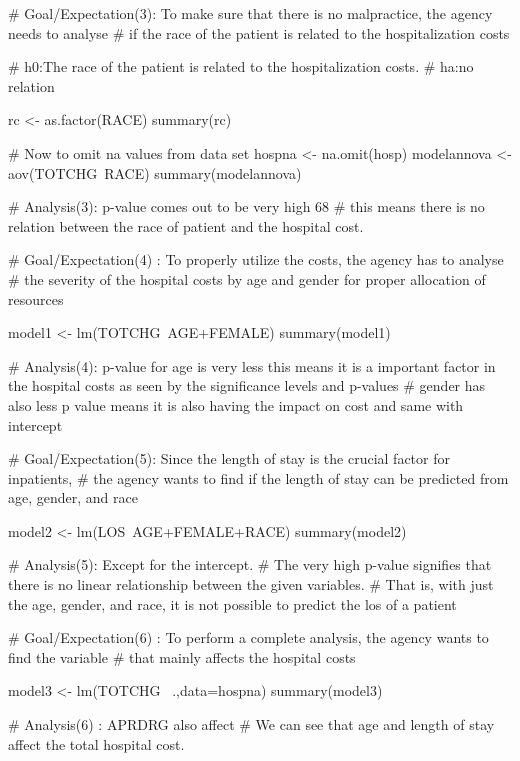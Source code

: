 # Goal/Expectation(3): To make sure that there is no malpractice, the agency needs to analyse
# if the race of the patient is related to the hospitalization costs

# h0:The race of the patient is related to the hospitalization costs. 
# ha:no relation

rc <- as.factor(RACE)
summary(rc)

# Now to omit na values from data set
hospna <- na.omit(hosp)
modelannova <- aov(TOTCHG~RACE)
summary(modelannova)

# Analysis(3): p-value comes out to be very high 68%
# this means  there is no relation between the race of patient and the hospital cost. 

# Goal/Expectation(4) : To properly utilize the costs, the agency has to analyse 
# the severity of the hospital costs by age and gender for proper allocation of resources

model1 <- lm(TOTCHG~AGE+FEMALE)
summary(model1)


# Analysis(4):  p-value for age is very less this means it is a  important factor in the hospital costs as seen by the significance levels and p-values
# gender has also less p value means it is also having the impact on cost and same with intercept

# Goal/Expectation(5): Since the length of stay is the crucial factor for inpatients, 
# the agency wants to find if the length of stay can be predicted from age, gender, and race

model2 <- lm(LOS~AGE+FEMALE+RACE)
summary(model2)


# Analysis(5): Except for the intercept.
# The very high p-value signifies that there is no linear relationship between the given variables.
# That is, with just the age, gender, and race, it is not possible to predict the los of a patient


# Goal/Expectation(6) : To perform a complete analysis, the agency wants to find the variable
# that mainly affects the hospital costs

model3 <- lm(TOTCHG~ .,data=hospna) 
summary(model3)

# Analysis(6) : APRDRG also affect
# We can see that age and length of stay affect the total hospital cost.